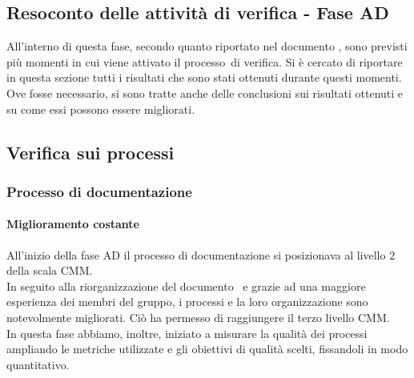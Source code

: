 \documentclass[../PianoDiQualifica.tex]{subfiles}
\begin{document}
\begin{appendices}
\section{Resoconto delle attività di verifica - Fase AD}
All'interno di questa fase\g, secondo quanto riportato nel documento \pianodiprogetto, sono previsti più momenti in cui viene attivato il processo\g\ di verifica. Si è cercato di riportare in questa sezione tutti i risultati che sono stati ottenuti durante questi momenti. Ove fosse necessario, si sono tratte anche delle conclusioni sui risultati ottenuti e su come essi possono essere migliorati.
	
	\subsection{Verifica sui processi}
		\subsubsection{Processo di documentazione}
			\paragraph{Miglioramento costante}
			All'inizio della fase AD il processo di documentazione si posizionava al livello 2 della scala CMM.\\
			In seguito alla riorganizzazione del documento \normediprogetto\ e grazie ad una maggiore esperienza dei membri del gruppo, i processi e la loro organizzazione sono notevolmente migliorati. Ciò ha permesso di raggiungere il terzo livello CMM.\\
			In questa fase abbiamo, inoltre, iniziato a misurare la qualità dei processi ampliando le metriche utilizzate e gli obiettivi di qualità scelti, fissandoli in modo quantitativo.
			

\end{appendices}
\end{document}
